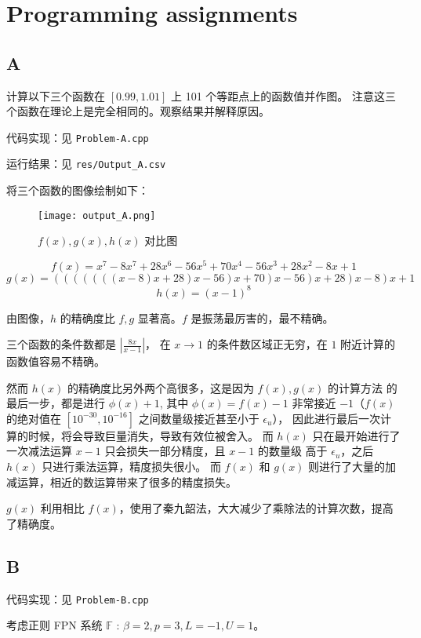 \documentclass[lang=cn,a4paper,newtx,bibend=bibtex]{elegantpaper}
\begin{document}
\section{Programming assignments}

\subsection{A}

计算以下三个函数在 $[0.99, 1.01]$ 上 101 个等距点上的函数值并作图。
注意这三个函数在理论上是完全相同的。观察结果并解释原因。

代码实现：见 \lstinline{Problem-A.cpp}

运行结果：见 \lstinline{res/Output_A.csv}

将三个函数的图像绘制如下：

\begin{figure}[H]
  \centering
  \texttt{[image: output\_A.png]} 
  \caption{$f(x), g(x), h(x)$ 对比图}
\end{figure}

\[
  f(x) = x^7 - 8x^7 + 28x^6 - 56x^5 + 70x^4 - 56x^3 + 28x^2 -8x + 1
\]
\[
  g(x) = (((((((x-8)x+28)x-56)x+70)x-56)x+28)x-8)x + 1
\]
\[
  h(x) = (x - 1)^8
\]

 由图像，$h$ 的精确度比 $f,g$ 显著高。$f$ 是振荡最厉害的，最不精确。
 
 三个函数的条件数都是 $|\frac{8x}{x-1}|$，
 在 $x\to 1$ 的条件数区域正无穷，在 $1$ 附近计算的函数值容易不精确。

 然而 $h(x)$ 的精确度比另外两个高很多，这是因为 $f(x),g(x)$ 的计算方法
 的最后一步，都是进行 $\phi(x) + 1$, 其中 $\phi(x) = f(x) - 1$ 非常接近
  $-1$（$f(x)$ 的绝对值在 $[10^{-30}, 10^{-16}]$ 之间数量级接近甚至小于 $\epsilon_u$），
  因此进行最后一次计算的时候，将会导致巨量消失，导致有效位被舍入。
而 $h(x)$ 只在最开始进行了一次减法运算 $x-1$ 只会损失一部分精度，且 $x-1$ 的数量级
高于 $\epsilon_u$，之后 $h(x)$ 只进行乘法运算，精度损失很小。
而 $f(x)$ 和 $g(x)$ 则进行了大量的加减运算，相近的数运算带来了很多的精度损失。

 $g(x)$ 利用相比 $f(x)$，使用了秦九韶法，大大减少了乘除法的计算次数，提高了精确度。



\subsection{B}

代码实现：见 \lstinline{Problem-B.cpp}

考虑正则 FPN 系统 $\mathbb{F}$ : $\beta = 2, p = 3, L = -1, U = 1$。
\end{document}
